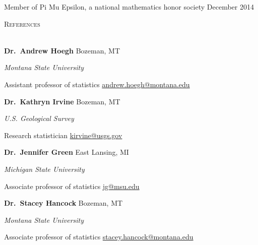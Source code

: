 \documentclass[a4paper]{article}
\newcommand{\lineunder} {
	\vspace*{-8pt} \\
	\hspace*{-18pt} \hrulefill \\
}
\newcommand{\header} [1] {
	{\hspace*{-18pt}\vspace*{6pt} \textsc{#1}}
	\vspace*{-6pt} \lineunder
}
\begin{document}
Member of Pi Mu Epsilon, a national mathematics honor society
\hfill December 2014

\vspace*{2mm}

\header{References}
\vspace*{2mm}

\textbf{Dr.~Andrew Hoegh} \hfill Bozeman, MT

\emph{Montana State University}

Assistant professor of statistics
\hfill \href{mailto:andrew.hoegh@montana.edu}{andrew.hoegh@montana.edu}

\vspace*{2mm}

\textbf{Dr.~Kathryn Irvine} \hfill Bozeman, MT

\emph{U.S. Geological Survey}

Research statistician
\hfill \href{mailto:kirvine@usgs.gov}{kirvine@usgs.gov}

\vspace*{2mm}

\textbf{Dr.~Jennifer Green} \hfill East Lansing, MI

\emph{Michigan State University}

Associate professor of statistics
\hfill \href{mailto:jg@msu.edu}{jg@msu.edu}

\vspace*{2mm}

\textbf{Dr.~Stacey Hancock} \hfill Bozeman, MT

\emph{Montana State University}

Associate professor of statistics
\hfill \href{mailto:stacey.hancock@montana.edu}{stacey.hancock@montana.edu}
\vspace*{2mm}
\end{document}
